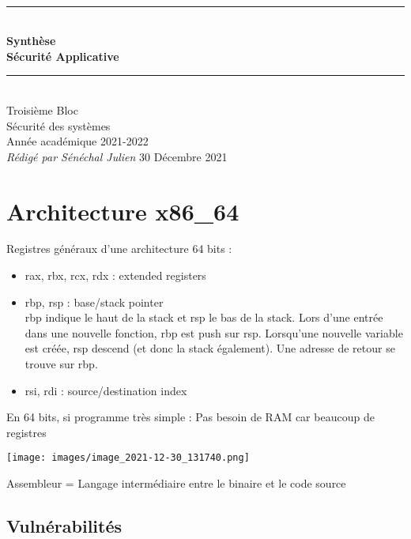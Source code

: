 \documentclass[a4paper]{article}
\newcommand{\HRule}{\rule{\linewidth}{0.5mm}}
\begin{document}
  \begin{titlepage}
    \begin{sffamily}
    \begin{center}
      \textnormal{}\\[6.5cm]
      \HRule \\[0.4cm]
      { \Huge \bfseries Synthèse\\ Sécurité Applicative\\ [0.4cm] }
      \HRule \\[3cm]
      \Large
      Troisième Bloc\\
      Sécurité des systèmes\\
      Année académique 2021-2022\\[0.2cm]
      \emph{Rédigé par Sénéchal Julien}
      \vfill
      {\large 30 Décembre 2021}
    \end{center}
    \end{sffamily}
  \end{titlepage}

\newpage
\tableofcontents

\newpage
\section{Architecture x86\_64}
Registres généraux d'une architecture 64 bits :
\begin{itemize}[label = \textbullet, font = \Large]
    \item rax, rbx, rcx, rdx : extended registers
    \item rbp, rsp : base/stack pointer\\
    rbp indique le haut de la stack et rsp le bas de la stack. Lors d'une entrée dans une nouvelle fonction, rbp est push sur rsp. Lorsqu'une nouvelle variable est créée, rsp descend (et donc la stack également). Une adresse de retour se trouve sur rbp.
    \item rsi, rdi : source/destination index
\end{itemize}

En 64 bits, si programme très simple : Pas besoin de RAM car beaucoup de registres
\begin{center}
  \texttt{[image: images/image\_2021-12-30\_131740.png]}  
\end{center}
Assembleur = Langage intermédiaire entre le binaire et le code source
\newpage
\subsection{Vulnérabilités}
\end{document}
